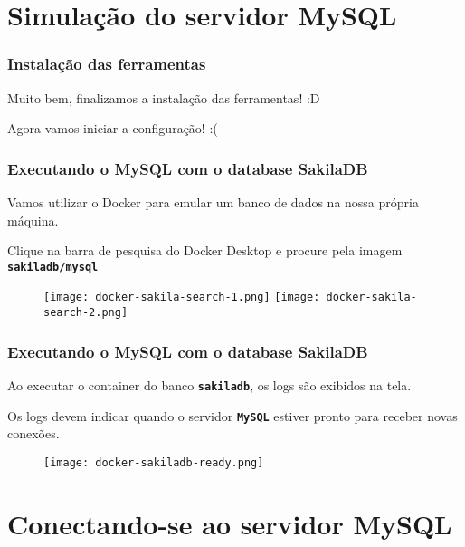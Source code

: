 \documentclass[t, 10pt, aspectratio=169, table, x11names]{beamer}
\begin{document}
	\section{Simulação do servidor MySQL}

	\begin{frame}
		\frametitle{Instalação das ferramentas}
		\vspace{0.5cm}
		\begin{center}
			\Large
			Muito bem, finalizamos a instalação das ferramentas! :D
		\end{center}
		\vspace{1cm}
		\begin{center}
			\LARGE
			Agora vamos iniciar a configuração! :(
		\end{center}
	\end{frame}
	
	\begin{frame}[t]
		\frametitle{Executando o MySQL com o database SakilaDB}
		Vamos utilizar o Docker para emular um banco de dados na nossa própria máquina.
		
		Clique na barra de pesquisa do Docker Desktop e procure pela imagem \textbf{\texttt{sakiladb/mysql}}
		\vspace{0.3cm}
		\begin{figure}[h]
			\texttt{[image: docker-sakila-search-1.png]}
			\hspace{0.5cm}
			\texttt{[image: docker-sakila-search-2.png]}
		\end{figure}
	\end{frame}
	
	\begin{frame}[t]
		\frametitle{Executando o MySQL com o database SakilaDB}
		Ao executar o container do banco \textbf{\texttt{sakiladb}}, os logs são exibidos na tela.
		
		Os logs devem indicar quando o servidor \texttt{\textbf{MySQL}} estiver pronto para receber novas conexões.
		\vspace{0.1cm}
		\begin{figure}[h]
			\texttt{[image: docker-sakiladb-ready.png]}
		\end{figure}
	\end{frame}

	\section{Conectando-se ao servidor MySQL}
\end{document}
